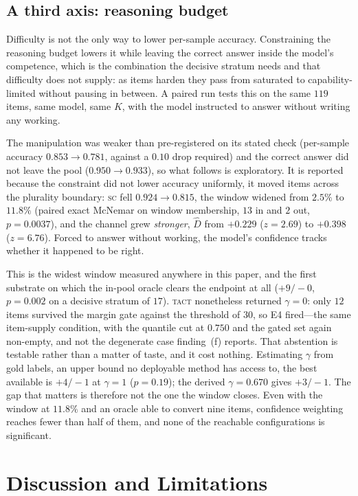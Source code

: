 \documentclass[twoside,11pt]{article}
\newcommand{\Dhat}{\widehat{D}}
\newcommand{\SC}{\textsc{sc}}
\newcommand{\TACT}{\textsc{tact}}
\begin{document}
\subsection{A third axis: reasoning budget}\label{sec:budget}
Difficulty is not the only way to lower per-sample accuracy. Constraining the
reasoning budget lowers it while leaving the correct answer inside the model's
competence, which is the combination the decisive stratum needs and that
difficulty does not supply: as items harden they pass from saturated to
capability-limited without pausing in between. A paired run tests this on the
same $119$ items, same model, same $K$, with the model instructed to answer
without writing any working.

The manipulation was weaker than pre-registered on its stated check
(per-sample accuracy $0.853\to0.781$, against a $0.10$ drop required) and the
correct answer did not leave the pool ($0.950\to0.933$), so what follows is
exploratory. It is reported because the constraint did not lower accuracy
uniformly, it moved items across the plurality boundary: \SC{} fell $0.924\to
0.815$, the window widened from $2.5\%$ to $11.8\%$ (paired exact McNemar on
window membership, $13$ in and $2$ out, $p=0.0037$), and the channel grew
\emph{stronger}, $\Dhat$ from $+0.229$ ($z=2.69$) to $+0.398$ ($z=6.76$).
Forced to answer without working, the model's confidence tracks whether it
happened to be right.

This is the widest window measured anywhere in this paper, and the first
substrate on which the in-pool oracle clears the endpoint at all ($+9/-0$,
$p=0.002$ on a decisive stratum of $17$). \TACT{} nonetheless returned
$\gamma=0$: only $12$ items survived the margin gate against the threshold of
$30$, so E4 fired---the same item-supply condition, with the quantile cut at
$0.750$ and the gated set again non-empty, and not the degenerate case
finding~(f) reports. That abstention is testable rather than a matter of taste,
and it cost nothing. Estimating $\gamma$ from gold labels, an upper bound no
deployable method has access to, the best available is $+4/-1$ at $\gamma=1$
($p=0.19$); the derived $\gamma=0.670$ gives $+3/-1$. The gap that matters is
therefore not the one the window closes. Even with the window at $11.8\%$ and
an oracle able to convert nine items, confidence weighting reaches fewer than
half of them, and none of the reachable configurations is significant.

\section{Discussion and Limitations}\label{sec:limits}
\end{document}
